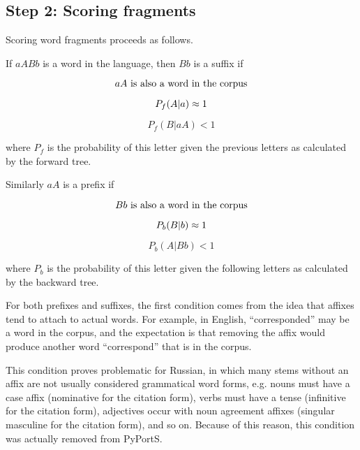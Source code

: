 \documentclass[paper=a4, fontsize=11pt]{article}
\begin{document}
\subsection{Step 2: Scoring fragments}

Scoring word fragments proceeds as follows. 

If $aABb$ is a word in the language, then $Bb$ is a suffix if

\begin{equation}
aA \text{ is also a word in the corpus} \\
\end{equation}

\begin{equation}
P_f (A|a) \approx 1 \\
\end{equation}

\begin{equation}
P_f (B|aA) < 1
\end{equation}

where $P_f$ is the probability of this letter given the previous letters as calculated by the forward tree. 

\clearpage
Similarly $aA$ is a prefix if

\begin{equation}
Bb \text{ is also a word in the corpus} \\
\end{equation}

\begin{equation}
P_b (B|b) \approx 1 \\
\end{equation}

\begin{equation}
P_b (A|Bb) < 1
\end{equation}

where $P_b$ is the probability of this letter given the following letters as calculated by the backward tree.

For both prefixes and suffixes, the first condition comes from the idea that affixes tend to attach to actual words. For example, in English, ``corresponded'' may be a word in the corpus, and the expectation is that removing the affix would produce another word ``correspond'' that is in the corpus. 

This condition proves problematic for Russian, in which many stems without an affix are not usually considered grammatical word forms, e.g. nouns must have a case affix (nominative for the citation form), verbs must have a tense (infinitive for the citation form), adjectives occur with noun agreement affixes (singular masculine for the citation form), and so on. Because of this reason, this condition was actually removed from PyPortS. 
\end{document}
